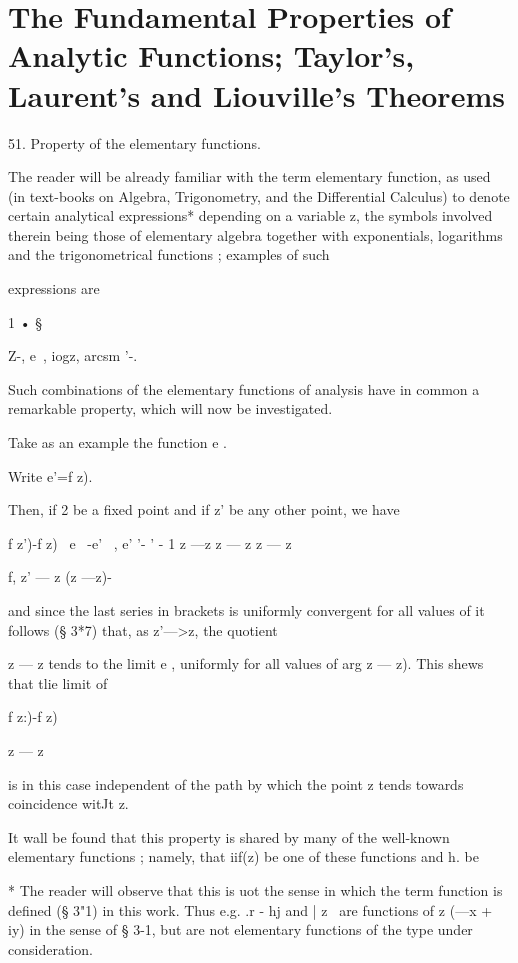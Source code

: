 \chapter{The Fundamental Properties of Analytic Functions; 
Taylor's, Laurent's and Liouville's Theorems} 

51. Property of the elementary functions. 

The reader will be already familiar with the term elementary function, as 
used (in text-books on Algebra, Trigonometry, and the Differential Calculus) 
to denote certain analytical expressions* depending on a variable z, the 
symbols involved therein being those of elementary algebra together with 
exponentials, logarithms and the trigonometrical functions ; examples of such 

expressions are 

1 • § 

Z-, e~, iogz, arcsm '-. 

Such combinations of the elementary functions of analysis have in common 
a remarkable property, which will now be investigated. 

Take as an example the function e . 

Write e'=f z). 

Then, if 2  be a fixed point and if z' be any other point, we have 

f z')-f z) \  e~ -e' \  , e' '- ' - 1 
z —z z — z z — z 

f, z' — z (z —z)- 

and since the last series in brackets is uniformly convergent for all values of 
  it follows (§ 3*7) that, as z'—>z, the quotient 

z — z 
tends to the limit e , uniformly for all values of arg  z — z). 
This shews that tlie limit of 

f z:)-f z) 

z — z 

is in this case independent of the path by which the point z tends towards 
coincidence witJt z. 

It wall be found that this property is shared by many of the well-known 
elementary functions ; namely, that iif(z) be one of these functions and h. be 

* The reader will observe that this is uot the sense in which the term function is defined 
(§ 3"1) in this work. Thus e.g. .r - hj and | z \ are functions of z (—x + iy) in the sense of § 3-1, 
but are not elementary functions of the type under consideration. 



